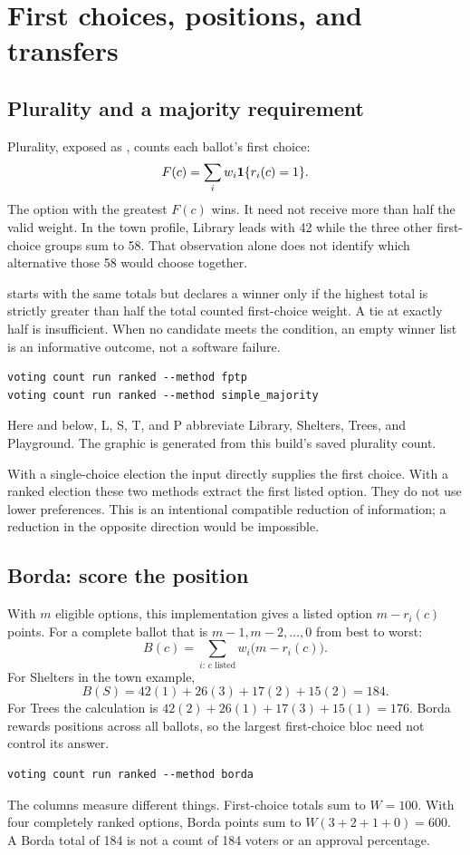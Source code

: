 \chapter{First choices, positions, and transfers}
\label{chap:ranked}
\section{Plurality and a majority requirement}
Plurality, exposed as , counts each ballot's first choice:
\[
F(c)=\sum_i w_i\mathbf{1}\{r_i(c)=1\}.
\]
The option with the greatest $F(c)$ wins. It need not receive more than half the valid weight. In the town profile, Library leads with 42 while the three other first-choice groups sum to 58. That observation alone does not identify which alternative those 58 would choose together.

 starts with the same totals but declares a winner only if the highest total is strictly greater than half the total counted first-choice weight. A tie at exactly half is insufficient. When no candidate meets the condition, an empty winner list is an informative outcome, not a software failure.
\begin{lstlisting}[style=votingrun]
voting count run ranked --method fptp
voting count run ranked --method simple_majority
\end{lstlisting}
\begin{center}
\end{center}
Here and below, L, S, T, and P abbreviate Library, Shelters, Trees, and Playground. The graphic is generated from this build's saved plurality count.

With a single-choice election the input directly supplies the first choice. With a ranked election these two methods extract the first listed option. They do not use lower preferences. This is an intentional compatible reduction of information; a reduction in the opposite direction would be impossible.

\section{Borda: score the position}
With $m$ eligible options, this implementation gives a listed option $m-r_i(c)$ points. For a complete ballot that is $m-1,m-2,\ldots,0$ from best to worst:
\[
B(c)=\sum_{i:\,c\text{ listed}}w_i\bigl(m-r_i(c)\bigr).
\]
For Shelters in the town example,
\[
B(S)=42(1)+26(3)+17(2)+15(2)=184.
\]
For Trees the calculation is $42(2)+26(1)+17(3)+15(1)=176$. Borda rewards positions across all ballots, so the largest first-choice bloc need not control its answer.
\begin{lstlisting}[style=votingrun]
voting count run ranked --method borda
\end{lstlisting}
The columns measure different things. First-choice totals sum to $W=100$. With four completely ranked options, Borda points sum to $W(3+2+1+0)=600$. A Borda total of 184 is not a count of 184 voters or an approval percentage.

